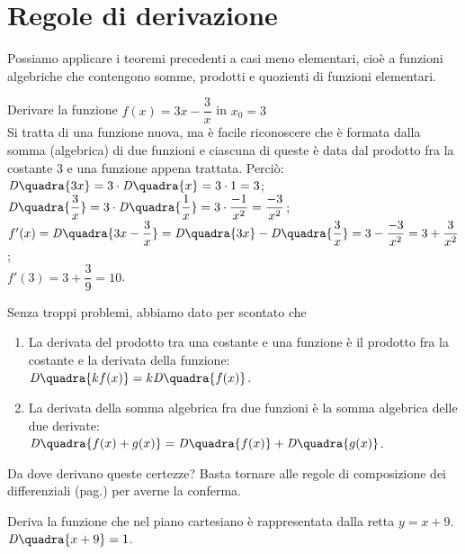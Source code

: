 \section{Regole di derivazione}
\label{sec:diff01_regolederivate}
Possiamo applicare i teoremi precedenti a casi meno elementari, cioè
a funzioni algebriche che contengono somme, prodotti e quozienti di
funzioni elementari. 
\begin{esempio}
  Derivare la funzione $f(x)= 3x-\dfrac{3}{x}$ in $x_0=3$\\
  Si tratta di una funzione nuova, ma è facile riconoscere che è formata 
  dalla somma (algebrica) di due funzioni e ciascuna di queste è data dal 
  prodotto fra la costante $3$ e una funzione appena trattata. Perciò:\\
  $\mathit{D}\quadra{3x}=3\cdot\mathit{D}\quadra{x}=3\cdot 1=3$; \tab
  $\mathit{D}\quadra{\dfrac{3}{x}}=3\cdot\mathit{D}\quadra{\dfrac{1}{x}}
  =3\cdot \dfrac{-1}{x^2}=\dfrac{-3}{x^2}$;\\
  $f'(x)=\mathit{D}\quadra{3x-\dfrac{3}{x}}=\mathit{D}\quadra{3x}-
  \mathit{D}\quadra{\dfrac{3}{x}}= 3-\dfrac{-3}{x^2}= 3+\dfrac{3}{x^2}$;\\
  $f'(3)=3+\dfrac{3}{9}= 10$.\\
\end{esempio}
Senza troppi problemi, abbiamo dato per scontato che 
\begin{enumerate}[noitemsep]
 \item La derivata del prodotto tra una costante e  una funzione è il 
prodotto
 fra la costante e la derivata della funzione:\\ 
 $\mathit{D}\quadra{kf(x)}=k\mathit{D}\quadra{f(x)}$.
 \item La derivata della somma algebrica fra due funzioni è la somma 
algebrica
 delle due derivate:\\
$\mathit{D}\quadra{f(x)+g(x)}=\mathit{D}\quadra{f(x)}+\mathit{D}\quadra{g(x)
}$.
\end{enumerate}
Da dove derivano queste certezze? Basta tornare alle regole di composizione
dei differenziali (pag.\pageref{subsec:diff01_combdiff}) per averne la 
conferma.

\begin{esempio}
Deriva la funzione che nel piano cartesiano è rappresentata dalla retta 
$y=x+9$.\\
$\mathit{D}\quadra{x+9}=1$.
\end{esempio}

